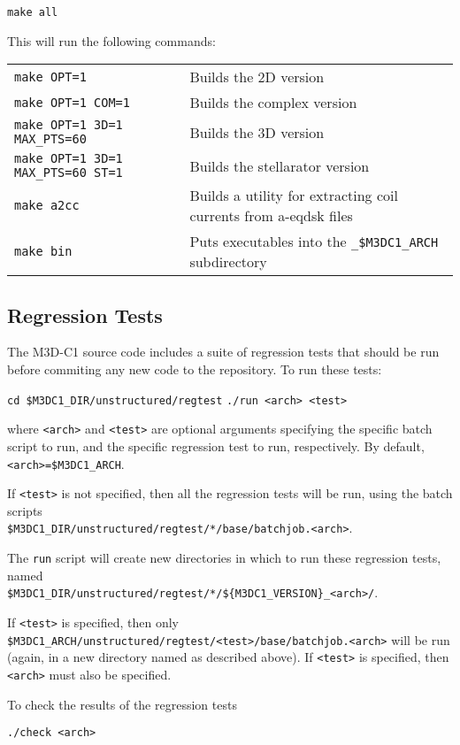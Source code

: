 \texttt{make all}

This will run the following commands:

\begin{tabular}{ll}
\texttt{make OPT=1} & Builds the 2D version\\
\texttt{make OPT=1 COM=1} & Builds the complex version\\
\texttt{make OPT=1 3D=1 MAX\_PTS=60} & Builds the 3D version\\
\texttt{make OPT=1 3D=1 MAX\_PTS=60 ST=1} & Builds the stellarator version\\
\texttt{make a2cc} & Builds a utility for extracting coil currents
from a-eqdsk files\\
\texttt{make bin} & Puts executables into the \texttt{\_\$M3DC1\_ARCH} subdirectory\\
\end{tabular}


\subsection{Regression Tests}

The M3D-C1 source code includes a suite of regression tests that
should be run before commiting any new code to the repository.  To run
these tests:

\texttt{cd \$M3DC1\_DIR/unstructured/regtest}
\texttt{./run <arch> <test>}

where \texttt{<arch>} and \texttt{<test>} are optional arguments
specifying the specific batch script to run, and the specific
regression test to run, respectively.  By default,
\texttt{<arch>=\$M3DC1\_ARCH}.

If \texttt{<test>} is not
specified, then all the regression tests will be run, using the batch
scripts\\
\texttt{\$M3DC1\_DIR/unstructured/regtest/*/base/batchjob.<arch>}.

The \texttt{run} script will create new directories in which to run
these regression tests, named\\
\texttt{\$M3DC1\_DIR/unstructured/regtest/*/\$\{M3DC1\_VERSION\}\_<arch>/}.

If \texttt{<test>} is specified, then only
\texttt{\$M3DC1\_ARCH/unstructured/regtest/<test>/base/batchjob.<arch>}
will be run (again, in a new directory named as described above).  If
\texttt{<test>} is specified, then \texttt{<arch>} must also be
specified.

To check the results of the regression tests

\texttt{./check <arch>}


